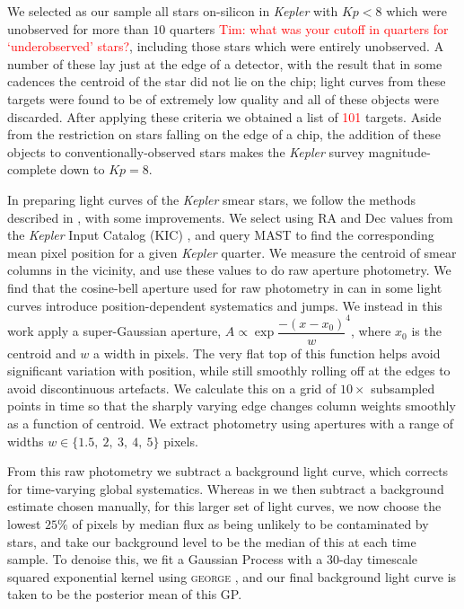 \documentclass[a4paper,fleqn,usenatbib]{mnras}
\newcommand{\kepler}{\emph{Kepler}\xspace}
\begin{document}
We selected as our sample all stars on-silicon in \kepler with $Kp<8$ which were unobserved for more than $10$ quarters \textcolor{red}{Tim: what was your cutoff in quarters for `underobserved' stars?}, including those stars which were entirely unobserved. A number of these lay just at the edge of a detector, with the result that in some cadences the centroid of the star did not lie on the chip; light curves from these targets were found to be of extremely low quality and all of these objects were discarded. After applying these criteria we obtained a list of \textcolor{red}{101} targets. Aside from the restriction on stars falling on the edge of a chip, the addition of these objects to conventionally-observed stars makes the \kepler survey magnitude-complete down to $Kp=8$. 

In preparing light curves of the \kepler smear stars, we follow the methods described in \citet{smear}, with some improvements. We select using RA and Dec values from the \kepler Input Catalog (KIC) \citep{kic}, and query MAST to find the corresponding mean pixel position for a given \kepler quarter. We measure the centroid of smear columns in the vicinity, and use these values to do raw aperture photometry. We find that the cosine-bell aperture used for raw photometry in \citet{smear} can in some light curves introduce position-dependent systematics and jumps. We instead in this work apply a super-Gaussian aperture, $A \propto \exp{\dfrac{-(x-x_0)}{w} ^ 4}$, where $x_0$ is the centroid and $w$ a width in pixels. The very flat top of this function helps avoid significant variation with position, while still smoothly rolling off at the edges to avoid discontinuous artefacts. We calculate this on a grid of $10\times$ subsampled points in time so that the sharply varying edge changes column weights smoothly as a function of centroid. We extract photometry using apertures with a range of widths $w \in\{1.5,~2,~3,~4,~5\}$ pixels.

From this raw photometry we subtract a background light curve, which corrects for time-varying global systematics. Whereas in \citet{smear} we then subtract a background estimate chosen manually, for this larger set of light curves, we now choose the lowest $25\%$ of pixels by median flux as being unlikely to be contaminated by stars, and take our background level to be the median of this at each time sample. To denoise this, we fit a Gaussian Process with a 30-day timescale squared exponential kernel using \textsc{george} \citep{hodlr}, and our final background light curve is taken to be the posterior mean of this GP. 
\end{document}
